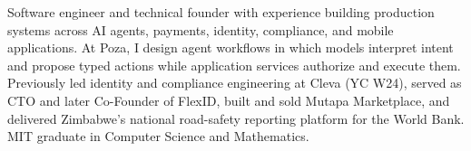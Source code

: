 
\begin{cvparagraph}
Software engineer and technical founder with experience building production systems across AI agents, payments, identity, compliance, and mobile applications. At Poza, I design agent workflows in which models interpret intent and propose typed actions while application services authorize and execute them. Previously led identity and compliance engineering at Cleva (YC W24), served as CTO and later Co-Founder of FlexID, built and sold Mutapa Marketplace, and delivered Zimbabwe's national road-safety reporting platform for the World Bank. MIT graduate in Computer Science and Mathematics.
\end{cvparagraph}
